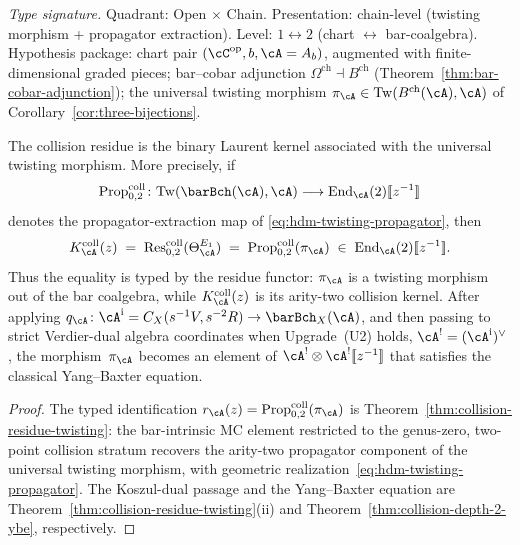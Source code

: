 \begin{theorem}
\label{thm:hdm-face-1}
\emph{Type signature.} Quadrant: Open $\times$ Chain. Presentation:
chain-level (twisting morphism + propagator extraction). Level:
$1\leftrightarrow 2$ (chart $\leftrightarrow$ bar-coalgebra). Hypothesis
package: chart pair $(\cC^{\mathrm{op}}, b, \cA = A_b)$, augmented
with finite-dimensional graded pieces; bar--cobar adjunction
$\Omega^{\mathrm{ch}}\dashv B^{\mathrm{ch}}$
(Theorem~\textup{\ref{thm:bar-cobar-adjunction}}); the universal
twisting morphism $\pi_\cA\in\mathrm{Tw}(B^{\mathrm{ch}}(\cA),\cA)$
of Corollary~\textup{\ref{cor:three-bijections}}.

The collision residue is the binary Laurent kernel associated with the
universal twisting morphism. More precisely, if
\[
\operatorname{Prop}^{\mathrm{coll}}_{0,2}\colon
\mathrm{Tw}(\barBch(\cA),\cA)\longrightarrow
\mathrm{End}_\cA(2)[\![z^{-1}]\!]
\]
denotes the propagator-extraction map of
\eqref{eq:hdm-twisting-propagator}, then
\begin{equation}\label{eq:hdm-face-1}
K_\cA^{\mathrm{coll}}(z)
\;=\;
\operatorname{Res}^{\mathrm{coll}}_{0,2}(\Theta_\cA^{E_1})
\;=\;
\operatorname{Prop}^{\mathrm{coll}}_{0,2}(\pi_\cA)
\;\in\;
\mathrm{End}_\cA(2)[\![z^{-1}]\!].
\end{equation}
Thus the equality is typed by the residue functor: $\pi_\cA$ is a
twisting morphism out of the bar coalgebra, while
$K_\cA^{\mathrm{coll}}(z)$ is its
arity-two collision kernel.
After applying
$q_\cA\colon\cA^{\mathrm{i}}=C_X(s^{-1}V,s^{-2}R)
\to\barBch_X(\cA)$, and then passing to strict Verdier-dual algebra
coordinates when Upgrade~\textup{(U2)} holds,
$\cA^!=(\cA^{\mathrm{i}})^\vee$, the morphism~$\pi_\cA$ becomes an
element of $\cA^! \otimes \cA^![\![z^{-1}]\!]$ that satisfies the
classical Yang--Baxter equation.
\end{theorem}

\begin{proof}
The typed identification
$r_\cA(z)=\operatorname{Prop}^{\mathrm{coll}}_{0,2}(\pi_\cA)$ is
Theorem~\ref{thm:collision-residue-twisting}: the bar-intrinsic MC
element restricted to the genus-zero, two-point collision stratum
recovers the arity-two propagator component of the universal twisting
morphism, with geometric realization~\eqref{eq:hdm-twisting-propagator}.
The Koszul-dual passage and the Yang--Baxter equation are
Theorem~\ref{thm:collision-residue-twisting}(ii) and
Theorem~\ref{thm:collision-depth-2-ybe}, respectively.
\end{proof}

